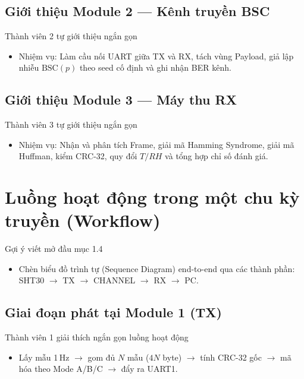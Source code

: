\documentclass[12pt,a4paper]{report}
\begin{document}
\subsection{Giới thiệu Module 2 --- Kênh truyền BSC}
\begin{notebox}{Thành viên 2 tự giới thiệu ngắn gọn}
\begin{itemize}[leftmargin=*,nosep]
    \item Nhiệm vụ: Làm cầu nối UART giữa TX và RX, tách vùng Payload, giả lập nhiễu $\text{BSC}(p)$ theo seed cố định và ghi nhận BER kênh.
\end{itemize}
\end{notebox}

\subsection{Giới thiệu Module 3 --- Máy thu RX}
\begin{notebox}{Thành viên 3 tự giới thiệu ngắn gọn}
\begin{itemize}[leftmargin=*,nosep]
    \item Nhiệm vụ: Nhận và phân tích Frame, giải mã Hamming Syndrome, giải mã Huffman, kiểm CRC-32, quy đổi $T/RH$ và tổng hợp chỉ số đánh giá.
\end{itemize}
\end{notebox}

\section{Luồng hoạt động trong một chu kỳ truyền (Workflow)}
\begin{notebox}{Gợi ý viết mở đầu mục 1.4}
\begin{itemize}[leftmargin=*,nosep]
    \item Chèn biểu đồ trình tự (Sequence Diagram) end-to-end qua các thành phần: SHT30 $\rightarrow$ TX $\rightarrow$ CHANNEL $\rightarrow$ RX $\rightarrow$ PC.
\end{itemize}
\end{notebox}

\subsection{Giai đoạn phát tại Module 1 (TX)}
\begin{notebox}{Thành viên 1 giải thích ngắn gọn luồng hoạt động}
\begin{itemize}[leftmargin=*,nosep]
    \item Lấy mẫu 1\,Hz $\rightarrow$ gom đủ $N$ mẫu ($4N$ byte) $\rightarrow$ tính CRC-32 gốc $\rightarrow$ mã hóa theo Mode A/B/C $\rightarrow$ đẩy ra UART1.
\end{itemize}
\end{notebox}
\end{document}
